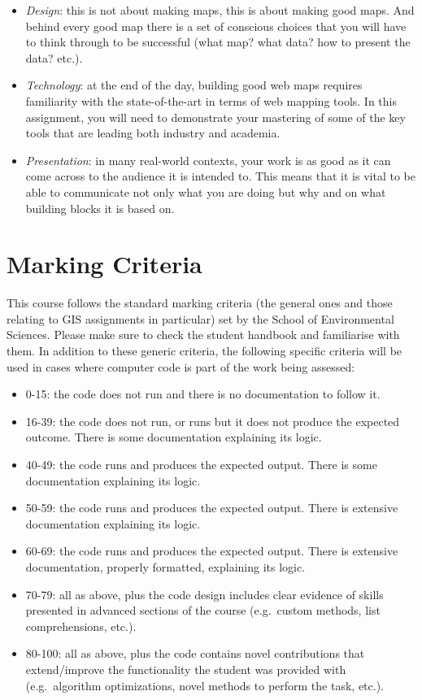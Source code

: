 \documentclass[
  letterpaper,
  DIV=11,
  numbers=noendperiod]{scrreprt}
\providecommand{\tightlist}{%
  \setlength{\itemsep}{0pt}\setlength{\parskip}{0pt}}\usepackage{longtable,booktabs,array}
\begin{document}
\begin{itemize}
\tightlist
\item
  \emph{Design}: this is not about making maps, this is about making
  good maps. And behind every good map there is a set of conscious
  choices that you will have to think through to be successful (what
  map? what data? how to present the data? etc.).
\item
  \emph{Technology}: at the end of the day, building good web maps
  requires familiarity with the state-of-the-art in terms of web mapping
  tools. In this assignment, you will need to demonstrate your mastering
  of some of the key tools that are leading both industry and academia.
\item
  \emph{Presentation}: in many real-world contexts, your work is as good
  as it can come across to the audience it is intended to. This means
  that it is vital to be able to communicate not only what you are doing
  but why and on what building blocks it is based on.
\end{itemize}

\hypertarget{marking-criteria}{%
\section*{Marking Criteria}\label{marking-criteria}}


This course follows the standard marking criteria (the general ones and
those relating to GIS assignments in particular) set by the School of
Environmental Sciences. Please make sure to check the student handbook
and familiarise with them. In addition to these generic criteria, the
following specific criteria will be used in cases where computer code is
part of the work being assessed:

\begin{itemize}
\tightlist
\item
  0-15: the code does not run and there is no documentation to follow
  it.
\item
  16-39: the code does not run, or runs but it does not produce the
  expected outcome. There is some documentation explaining its logic.
\item
  40-49: the code runs and produces the expected output. There is some
  documentation explaining its logic.
\item
  50-59: the code runs and produces the expected output. There is
  extensive documentation explaining its logic.
\item
  60-69: the code runs and produces the expected output. There is
  extensive documentation, properly formatted, explaining its logic.
\item
  70-79: all as above, plus the code design includes clear evidence of
  skills presented in advanced sections of the course (e.g.~custom
  methods, list comprehensions, etc.).
\item
  80-100: all as above, plus the code contains novel contributions that
  extend/improve the functionality the student was provided with
  (e.g.~algorithm optimizations, novel methods to perform the task,
  etc.).
\end{itemize}
\end{document}
